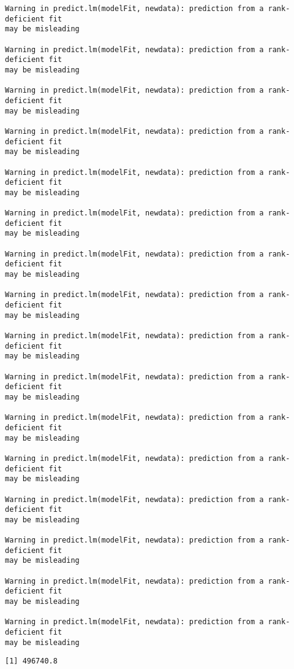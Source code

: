 \documentclass[
  letterpaper,
  DIV=11,
  numbers=noendperiod]{scrartcl}
\begin{document}
\begin{verbatim}
Warning in predict.lm(modelFit, newdata): prediction from a rank-deficient fit
may be misleading

Warning in predict.lm(modelFit, newdata): prediction from a rank-deficient fit
may be misleading

Warning in predict.lm(modelFit, newdata): prediction from a rank-deficient fit
may be misleading

Warning in predict.lm(modelFit, newdata): prediction from a rank-deficient fit
may be misleading

Warning in predict.lm(modelFit, newdata): prediction from a rank-deficient fit
may be misleading

Warning in predict.lm(modelFit, newdata): prediction from a rank-deficient fit
may be misleading

Warning in predict.lm(modelFit, newdata): prediction from a rank-deficient fit
may be misleading

Warning in predict.lm(modelFit, newdata): prediction from a rank-deficient fit
may be misleading

Warning in predict.lm(modelFit, newdata): prediction from a rank-deficient fit
may be misleading

Warning in predict.lm(modelFit, newdata): prediction from a rank-deficient fit
may be misleading

Warning in predict.lm(modelFit, newdata): prediction from a rank-deficient fit
may be misleading

Warning in predict.lm(modelFit, newdata): prediction from a rank-deficient fit
may be misleading

Warning in predict.lm(modelFit, newdata): prediction from a rank-deficient fit
may be misleading

Warning in predict.lm(modelFit, newdata): prediction from a rank-deficient fit
may be misleading

Warning in predict.lm(modelFit, newdata): prediction from a rank-deficient fit
may be misleading

Warning in predict.lm(modelFit, newdata): prediction from a rank-deficient fit
may be misleading
\end{verbatim}

\begin{verbatim}
[1] 496740.8
\end{verbatim}
\end{document}
